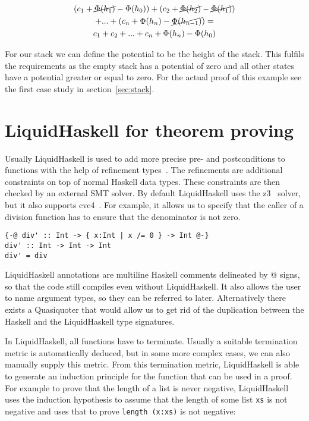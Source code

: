 \documentclass[sigplan,screen,review,anonymous]{acmart}
\begin{document}
\begin{gather}
\nonumber (c_1 + \cancel{\Phi(h_1)} - \Phi(h_0)) + (c_2 + \cancel{\Phi(h_2)} - \cancel{\Phi(h_1)}) \\
\nonumber    + ... + (c_n + \Phi(h_n) - \cancel{\Phi(h_{n - 1})}) = \\
  c_1 + c_2 + ... + c_n + \Phi(h_n) - \Phi(h_0) \label{eq:sum}
\end{gather}

For our stack we can define the potential to be the height of the stack. This fulfils the requirements as the empty stack has a potential of zero and all other states have a potential greater or equal to zero. For the actual proof of this example see the first case study in section~\ref{sec:stack}.

\section{LiquidHaskell for theorem proving}\label{sec:liquidhaskell}

Usually LiquidHaskell is used to add more precise pre- and postconditions to functions with the help of refinement types~\cite{refinement_types}. The refinements are additional constraints on top of normal Haskell data types. These constraints are then checked by an external SMT solver. By default LiquidHaskell uses the z3~\cite{z3} solver, but it also supports cvc4~\cite{cvc4}. For example, it allows us to specify that the caller of a division function has to ensure that the denominator is not zero.

\begin{lstlisting}
{-@ div' :: Int -> { x:Int | x /= 0 } -> Int @-}
div' :: Int -> Int -> Int
div' = div
\end{lstlisting}

LiquidHaskell annotations are multiline Haskell comments delineated by @ signs, so that the code still compiles even without LiquidHaskell. It also allows the user to name argument types, so they can be referred to later. Alternatively there exists a Quasiquoter that would allow us to get rid of the duplication between the Haskell and the LiquidHaskell type signatures.

In LiquidHaskell, all functions have to terminate. Usually a suitable termination metric is automatically deduced, but in some more complex cases, we can also manually supply this metric. From this termination metric, LiquidHaskell is able to generate an induction principle for the function that can be used in a proof. For example to prove that the length of a list is never negative, LiquidHaskell uses the induction hypothesis to assume that the length of some list \texttt{xs} is not negative and uses that to prove \texttt{length (x:xs)} is not negative:
\end{document}
